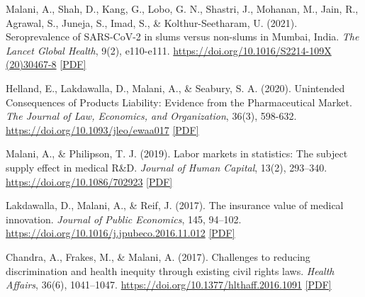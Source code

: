 \begin{tablist}
        \item[2021] \tab{}Malani, A., Shah, D., Kang, G., Lobo, G. N., Shastri, J., Mohanan, M., Jain, R., Agrawal, S., Juneja, S., Imad, S., \& Kolthur-Seetharam, U. (2021). Seroprevalence of SARS-CoV-2 in slums versus non-slums in Mumbai, India. \textit{The Lancet Global Health}, 9(2), e110-e111. \href{https://doi.org/10.1016/S2214-109X(20)30467-8}{https://doi.org/10.1016/S2214-109X (20)30467-8} \href{https://github.com/anup-malani/website_personal/blob/main/publications/2021_MalaniEtAl_LancetGH_SeroMumbaiSlums.pdf}{[PDF]}

        \item[2020] \tab{}Helland, E., Lakdawalla, D., Malani, A., \& Seabury, S. A. (2020). Unintended Consequences of Products Liability: Evidence from the Pharmaceutical Market. \textit{The Journal of Law, Economics, and Organization}, 36(3), 598-632. \href{https://doi.org/10.1093/jleo/ewaa017}{https://doi.org/10.1093/jleo/ewaa017} \href{https://github.com/anup-malani/website_personal/blob/main/publications/2020_HellandMalaniEtAl_JLEO_PharmaProductsLiability.pdf}{[PDF]} 
        
        \item[2019] \tab{}Malani, A., \& Philipson, T. J. (2019). Labor markets in statistics: The subject supply effect in medical R\&D. \textit{Journal of Human Capital}, 13(2), 293–340. \href{https://doi.org/10.1086/702923}{https://doi.org/10.1086/702923} \href{https://github.com/anup-malani/website_personal/blob/main/publications/2019_MalaniPhilipson_JHC_TrialSubjectMarket.pdf}{[PDF]}
        
        \item[2017] \tab{}Lakdawalla, D., Malani, A., \& Reif, J. (2017). The insurance value of medical innovation. \textit{Journal of Public Economics}, 145, 94–102. \href{https://doi.org/10.1016/j.jpubeco.2016.11.012}{https://doi.org/10.1016/j.jpubeco.2016.11.012} \href{https://github.com/anup-malani/website_personal/blob/main/publications/2017_LakdawallaMalaniReif_JPubEcon_ValueInnovation.pdf}{[PDF]}
        
        \item[2017] \tab{}Chandra, A., Frakes, M., \& Malani, A. (2017). Challenges to reducing discrimination and health inequity through existing civil rights laws. \textit{Health Affairs}, 36(6), 1041–1047. \href{https://doi.org/10.1377/hlthaff.2016.1091}{https://doi.org/10.1377/hlthaff.2016.1091} \href{https://github.com/anup-malani/website_personal/blob/main/publications/2017_ChandraFrakesMalani_HealthAffairs_CivilRights.pdf}{[PDF]}


\end{tablist}
